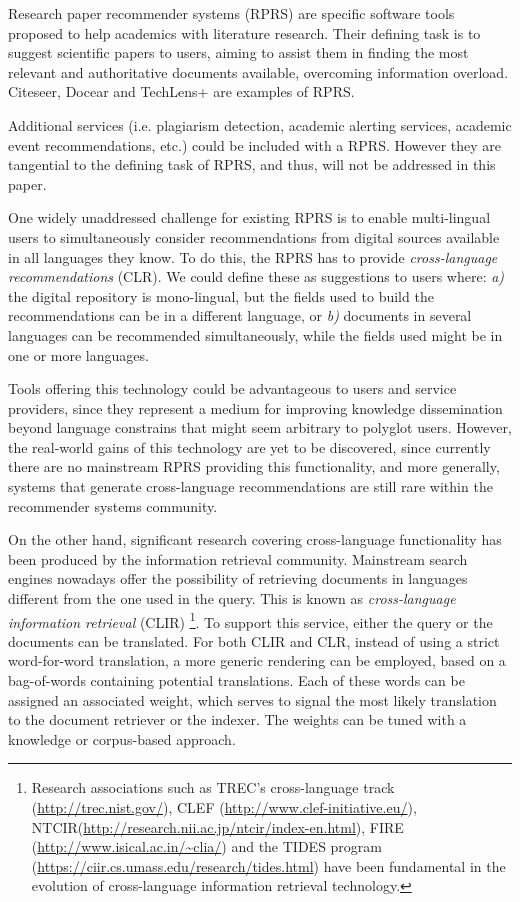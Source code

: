 \documentclass{llncs}
\begin{document}
Research paper recommender systems (RPRS) are specific software tools proposed to help academics with literature research. Their defining task is to suggest scientific papers to users, aiming to assist them in finding the most relevant and authoritative documents available, overcoming information overload. Citeseer\cite{Bollacker:2000:DRS:630311.630533}, Docear\cite{Beel:2013:IDR:2467696.2467786} and TechLens+\cite{Torres:2004:EDL:996350.996402} are examples of RPRS. 

Additional services (i.e. plagiarism detection, academic alerting services, academic event recommendations, etc.) could be included with a RPRS. However they are tangential to the defining task of RPRS, and thus, will not be addressed in this paper.

One widely unaddressed challenge for existing RPRS is to enable multi-lingual users to simultaneously consider recommendations from digital sources available in all languages they know. To do this, the RPRS has to provide \textit{cross-language recommendations} (CLR). We could define these as suggestions to users where: \textit{a)} the digital repository is mono-lingual, but the fields used to build the recommendations can be in a different language, or \textit{b)} documents in several languages can be recommended simultaneously, while the fields used might be in one or more languages. 

Tools offering this technology could be advantageous to users and service providers, since they represent a medium for improving knowledge dissemination beyond language constrains that might seem arbitrary to polyglot users. However, the real-world gains of this technology are yet to be discovered, since currently there are no mainstream RPRS providing this functionality, and more generally, systems that generate cross-language recommendations are still rare within the recommender systems community.

On the other hand, significant research covering cross-language functionality has been produced by the information retrieval community. Mainstream search engines nowadays offer the possibility of retrieving documents in languages different from the one used in the query. This is known as \textit{cross-language information retrieval} (CLIR) \footnote{Research associations such as TREC's cross-language track (\url{http://trec.nist.gov/}), CLEF (\url{http://www.clef-initiative.eu/}), NTCIR(\url{http://research.nii.ac.jp/ntcir/index-en.html}), FIRE (\url{http://www.isical.ac.in/~clia/}) and the TIDES program (\url{https://ciir.cs.umass.edu/research/tides.html}) have been fundamental in the evolution of cross-language information retrieval technology.}. To support this service, either the query or the documents can be translated. For both CLIR and CLR, instead of using a strict word-for-word translation, a more generic rendering can be employed, based on a bag-of-words containing potential translations. Each of these words can be assigned an associated weight, which serves to signal the most likely translation to the document retriever or the indexer. The weights can be tuned with a knowledge or corpus-based approach.
\end{document}
